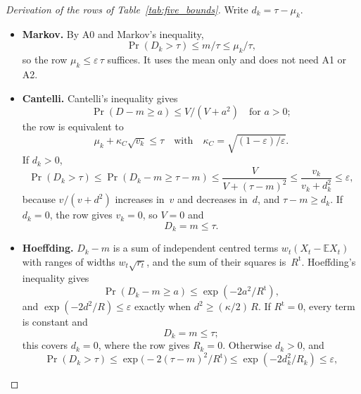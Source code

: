 \documentclass[11pt,a4paper]{article}
\theoremstyle{plain}
\theoremstyle{definition}
\theoremstyle{remark}
\begin{document}
\label{drv:five_rows}
\begin{proof}[Derivation of the rows of Table~\ref{tab:five_bounds}]
Write $d_k = \tau - \mu_k$.
\begin{itemize}
  \item \textbf{Markov.} By A0 and Markov's inequality,
    \begin{equation}
      \Pr(D_k > \tau) \le m/\tau \le \mu_k/\tau,
    \end{equation}
    so the row $\mu_k \le \varepsilon\,\tau$ suffices.
    It uses the mean only and does not need A1 or A2.
  \item \textbf{Cantelli.} Cantelli's inequality gives
    \begin{equation}
      \Pr(D - m \ge a) \le V/(V + a^2) \quad\text{for } a > 0;
    \end{equation}
    the row is equivalent to
    \begin{equation}
      \mu_k + \kappa_C\sqrt{v_k} \le \tau
      \quad\text{with}\quad
      \kappa_C = \sqrt{(1-\varepsilon)/\varepsilon}.
    \end{equation}
    If $d_k > 0$,
    \begin{equation}
      \Pr(D_k > \tau) \le \Pr(D_k - m \ge \tau - m) \le \frac{V}{V + (\tau - m)^2} \le \frac{v_k}{v_k + d_k^2} \le \varepsilon,
    \end{equation}
    because $v/(v + d^2)$ increases in~$v$ and decreases in~$d$, and $\tau - m \ge d_k$.
    If $d_k = 0$, the row gives $v_k = 0$, so $V = 0$ and
    \begin{equation}
      D_k = m \le \tau.
    \end{equation}
  \item \textbf{Hoeffding.} $D_k - m$ is a sum of independent centred terms $w_t(X_t - \mathbb{E}X_t)$ with ranges of widths $w_t\sqrt{r_t}$, and the sum of their squares is~$R^{\mathrm{t}}$.
    Hoeffding's inequality gives
    \begin{equation}
      \Pr(D_k - m \ge a) \le \exp(-2a^2/R^{\mathrm{t}}),
    \end{equation}
    and $\exp(-2d^2/R) \le \varepsilon$ exactly when $d^2 \ge (\kappa/2)\,R$.
    If $R^{\mathrm{t}} = 0$, every term is constant and
    \begin{equation}
      D_k = m \le \tau;
    \end{equation}
    this covers $d_k = 0$, where the row gives $R_k = 0$.
    Otherwise $d_k > 0$, and
    \begin{equation}
      \Pr(D_k > \tau) \le \exp\bigl(-2(\tau - m)^2/R^{\mathrm{t}}\bigr) \le \exp(-2d_k^2/R_k) \le \varepsilon,

\end{equation}
\end{itemize}
\end{proof}
\end{document}
